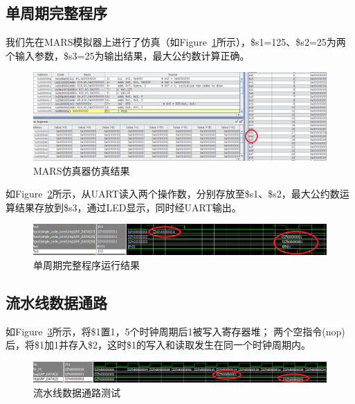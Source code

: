 \documentclass{article}
\begin{document}
        \subsection{单周期完整程序}
            我们先在MARS模拟器上进行了仿真（如Figure~\ref{fig:singlecycle_full1}所示），\$s1=125、\$s2=25为两个输入参数，\$s3=25为输出结果，最大公约数计算正确。
            \begin{figure}[H]
                \centering
                \includegraphics[width=\textwidth]{images/singlecycle_full1.png}
                \caption{\label{fig:singlecycle_full1}MARS仿真器仿真结果}
            \end{figure}
            如Figure~\ref{fig:singlecycle_full2}所示，从UART读入两个操作数，分别存放至\$s1、\$s2，最大公约数运算结果存放到\$s3，通过LED显示，同时经UART输出。
            \begin{figure}[H]
                \centering
                \includegraphics[width=\textwidth]{images/singlecycle_full2.png}
                \caption{\label{fig:singlecycle_full2}单周期完整程序运行结果}
            \end{figure}

        \subsection{流水线数据通路}
            如Figure~\ref{fig:pipeline_datapathtest}所示，将\$1置1，5个时钟周期后1被写入寄存器堆；
            两个空指令(nop)后，将\$1加1并存入\$2，这时\$1的写入和读取发生在同一个时钟周期内。
            \begin{figure}[H]
                \centering
                \includegraphics[width=\textwidth]{images/pipeline_datapathtest.png}
                \caption{\label{fig:pipeline_datapathtest}流水线数据通路测试}
            \end{figure}
\end{document}

